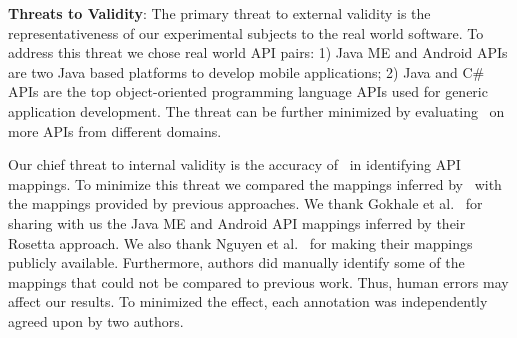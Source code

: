 

 

\textbf{Threats to Validity}: The primary threat to external validity is the representativeness of our experimental subjects to the real world software.
To address this threat we chose real world API pairs:
1) Java ME and Android APIs are two Java based platforms to develop mobile applications; 
2) Java and C\# APIs are the top object-oriented programming language APIs used for generic application development. 
The threat can be further minimized by evaluating \tool\ on more APIs from different domains. 

Our chief threat to internal validity is the accuracy of \tool\ in identifying API mappings. 
To minimize this threat we compared the mappings inferred by \tool\ with
the mappings provided by previous approaches. We thank Gokhale et al.~\cite{Gokhale2013ICSE} for sharing with us the Java ME and Android API mappings inferred by their Rosetta approach. We also thank Nguyen et al.~\cite{nguyen2014statistical} for making their mappings publicly available. Furthermore, authors did manually identify some of the mappings that could not be compared to previous work.
Thus, human errors may affect our results. 
To minimized the effect, each annotation was independently agreed upon by two authors.
